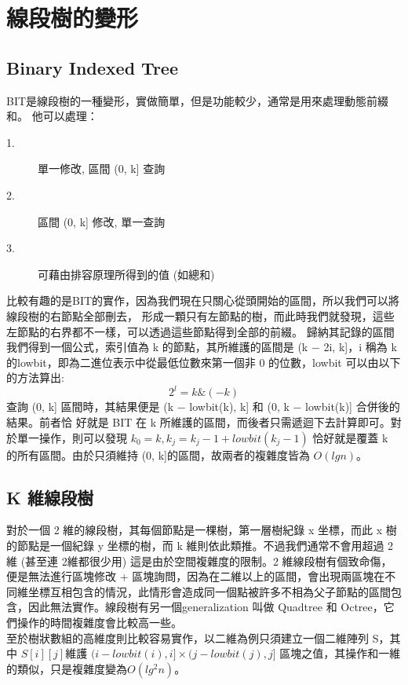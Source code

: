 \documentclass{article}
\begin{document}
\section{線段樹的變形}
\subsection{Binary Indexed Tree}
BIT是線段樹的一種變形，實做簡單，但是功能較少，通常是用來處理動態前綴和。
他可以處理：
\begin{description}
\item[ 1.]單一修改, 區間 (0, k] 查詢
\item[ 2.]區間 (0, k] 修改, 單一查詢
\item[ 3.]可藉由排容原理所得到的值 (如總和)
\end{description}
比較有趣的是BIT的實作，因為我們現在只關心從頭開始的區間，所以我們可以將線段樹的右節點全部刪去，
形成一顆只有左節點的樹，而此時我們就發現，這些左節點的右界都不一樣，可以透過這些節點得到全部的前綴。
歸納其記錄的區間我們得到一個公式，索引值為 k 的節點，其所維護的區間是 (k − 2i, k]，i 稱為 k 的lowbit，即為二進位表示中從最低位數來第一個非 0 的位數，lowbit 可以由以下的方法算出:
$$2^l = k\&(−k)$$
查詢 (0, k] 區間時，其結果便是 (k − lowbit(k), k] 和 (0, k − lowbit(k)] 合併後的結果。前者恰
好就是 BIT 在 k 所維護的區間，而後者只需遞迴下去計算即可。對於單一操作，則可以發現 $k_0 = k, k_j = k_j−1 + lowbit(k_j−1)$ 恰好就是覆蓋 k 的所有區間。由於只須維持 (0, k]的區間，故兩者的複雜度皆為 $O(lg n)$。

\subsection{K 維線段樹}
對於一個 2 維的線段樹，其每個節點是一棵樹，第一層樹紀錄 x 坐標，而此 x 樹的節點是一個紀錄 y 坐標的樹，而 k 維則依此類推。不過我們通常不會用超過 2 維 (甚至連 2維都很少用) 這是由於空間複雜度的限制。2 維線段樹有個致命傷，便是無法進行區塊修改 + 區塊詢問，因為在二維以上的區間，會出現兩區塊在不同維坐標互相包含的情況，此情形會造成同一個點被許多不相為父子節點的區間包含，因此無法實作。線段樹有另一個generalization 叫做 Quadtree 和 Octree，它們操作的時間複雜度會比較高一些。\\
至於樹狀數組的高維度則比較容易實作，以二維為例只須建立一個二維陣列 S，其中 $S[i][j]$維護 $(i − lowbit(i), i] × (j − lowbit(j), j]$ 區塊之值，其操作和一維的類似，只是複雜度變為$O(lg^2 n)$。
\end{document}
